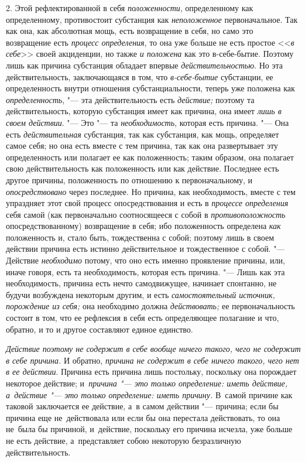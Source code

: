 2. Этой рефлектированной в себя {\em положенности},
определенному как определенному, противостоит субстанция как
{\em неположенное} первоначальное. Так как она, как
абсолютная мощь, есть возвращение в себя, но само это возвращение есть
{\em процесс определения}, то она уже больше не есть
простое <<{\em в себе}>> своей акциденции, но также
{\em и положена} как это в-себе-бытие. Поэтому лишь как
причина субстанция обладает впервые
{\em действительностью}. Но эта действительность,
заключающаяся в том, что {\em в-себе-бытие} субстанции,
ее определенность внутри отношения субстанциальности, теперь уже положена
как {\em определенность}, "--- эта действительность есть
{\em действие;} поэтому та действительность, которую
субстанция имеет как причина, она имеет {\em лишь в
своем действии}. "--- Это "--- та {\em необходимость},
которая есть причина. "--- Она есть {\em действительная}
субстанция, так как субстанция, как мощь, определяет самое себя; но она
есть вместе с тем причина, так как она развертывает эту определенность или
полагает ее как положенность; таким образом, она полагает свою
действительность как положенность или как действие. Последнее есть другое
причины, положенность по отношению к первоначальному, и
{\em опосредствовано} через последнее. Но причина, как
необходимость, вместе с тем упраздняет этот свой процесс опосредствования и
есть в {\em процессе определения} себя самой (как
первоначально соотносящееся с собой в
{\em противоположность} опосредствованному) возвращение
в себя; ибо положенность определена {\em как}
положенность и, стало быть, тождественна с собой; поэтому лишь в своем
действии причина есть истинно действительное и тождественное с собой. "---
Действие {\em необходимо} потому, что оно есть именно
проявление причины, или, иначе говоря, есть та необходимость, которая есть
причина. "--- Лишь как эта необходимость, причина есть нечто самодвижущее,
начинает спонтанно, не будучи возбуждена некоторым другим, и есть
{\em самостоятельный источник, порождение из себя;} она
необходимо должна {\em действовать;} ее
первоначальность состоит в том, что ее рефлексия в себя есть определяющее
полагание и что, обратно, и то и другое составляют единое единство.

{\em Действие поэтому не содержит в себе вообще ничего такого, чего не содержит
в себе причина.} И обратно, {\em причина не содержит в себе ничего такого, чего
нет в ее действии}. Причина есть причина лишь постольку, поскольку она
порождает некоторое действие; и~{\em причина "--- это только определение:
иметь действие, а~действие "--- это только определение: иметь причину.}
В~самой причине как таковой заключается ее действие, а~в самом действии "---
причина; если бы причина еще не~действовала или если бы она перестала
действовать, то она не~была бы причиной, и~действие, поскольку его причина
исчезла, уже больше не есть действие, а~представляет собою некоторую
безразличную действительность.

